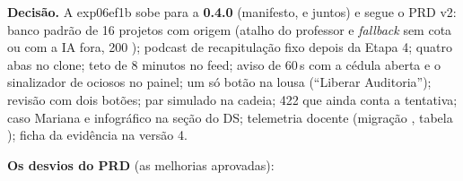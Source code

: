 \textbf{Decisão.} A exp06ef1b sobe para a \textbf{0.4.0} (manifesto,
 e  juntos) e segue o PRD v2: banco padrão de
16 projetos com origem  (atalho do professor e \emph{fallback} sem
cota ou com a IA fora, 200 ); podcast de recapitulação fixo
depois da Etapa 4; quatro abas no clone; teto de 8 minutos no feed; aviso de
60\,s com a cédula aberta e o sinalizador de ociosos no painel; um só botão
na lousa (\enquote{Liberar Auditoria}); revisão com dois botões; par simulado
na cadeia; 422  que ainda conta a tentativa; caso Mariana
e infográfico na seção  do DS; telemetria docente (migração
, tabela
); ficha da evidência na versão 4.

\textbf{Os desvios do PRD} (as melhorias aprovadas):

